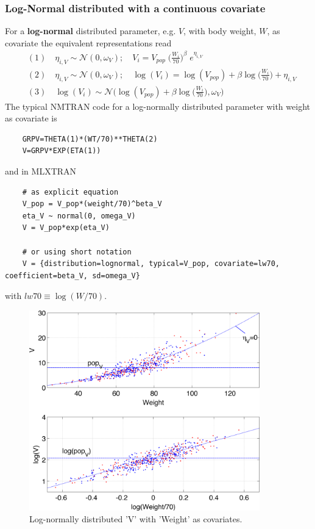 \subsubsection{Log-Normal distributed with a continuous covariate}
For a \textbf{log-normal} distributed parameter, e.g. $V$, with body weight, $W$, as covariate the equivalent representations read
\begin{align*}
& (1) \quad \eta_{i,V} \sim \mathcal{N}(0,\omega_V); \quad V_i= V_{pop} \; \big(\frac{W_i}{70}\big)^\beta \; e^{\eta_{i,V}}   \\
&(2) \quad \eta_{i,V} \sim \mathcal{N}(0,\omega_V); \quad \log( V_i ) = \log( V_{pop} ) + \beta \log\big(\frac{W_i}{70}\big) + \eta_{i,V}  \\
&(3) \quad \log( V_i ) \sim \mathcal{N}\big( \log( V_{pop} )+ \beta\log\Big(\frac{W_i}{70}\Big),\omega_V\big)
\end{align*}
The typical NMTRAN code for a log-normally distributed parameter with weight as covariate is
\begin{lstlisting}
	GRPV=THETA(1)*(WT/70)**THETA(2)
	V=GRPV*EXP(ETA(1))
\end{lstlisting}
and in MLXTRAN
\begin{lstlisting}
	# as explicit equation
	V_pop = V_pop*(weight/70)^beta_V
	eta_V ~ normal(0, omega_V)	
	V = V_pop*exp(eta_V)

	# or using short notation
	V = {distribution=lognormal, typical=V_pop, covariate=lw70, coefficient=beta_V, sd=omega_V}
\end{lstlisting}
with $lw70 \equiv \log(W/70)$.

\begin{figure}[htbp]
\centering
 \includegraphics[width=100mm]{pics/paramCovModel_VlogV}
\caption{Log-normally distributed 'V' with 'Weight' as covariates.}
\label{fig:parameterCovModel1}
\end{figure}


